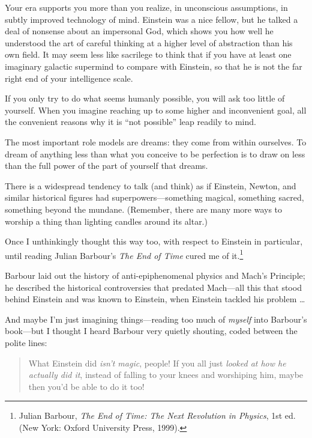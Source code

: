 {
 Your era supports you more than you realize, in unconscious
assumptions, in subtly improved technology of mind. Einstein was a nice
fellow, but he talked a deal of nonsense about an impersonal God, which
shows you how well he understood the art of careful thinking at a
higher level of abstraction than his own field. It may seem less like
sacrilege to think that if you have at least one imaginary galactic
supermind to compare with Einstein, so that he is not the far right end
of your intelligence scale.}

{
 If you only try to do what seems humanly possible, you will ask
too little of yourself. When you imagine reaching up to some higher and
inconvenient goal, all the convenient reasons why it is
``not possible'' leap readily to
mind.}

{
 The most important role models are dreams: they come from within
ourselves. To dream of anything less than what you conceive to be
perfection is to draw on less than the full power of the part of
yourself that dreams.}

\myendsectiontext


{
 There is a widespread tendency to talk (and think) as if Einstein,
Newton, and similar historical figures had superpowers---something
magical, something sacred, something beyond the mundane. (Remember,
there are many more ways to worship a thing than lighting candles
around its altar.) }

{
 Once I unthinkingly thought this way too, with respect to Einstein
in particular, until reading Julian Barbour's
\textit{The End of Time} cured me of it.\footnote{Julian Barbour, \textit{The End of Time: The Next Revolution in
Physics}, 1st ed. (New York: Oxford University Press, 1999).}}

{
 Barbour laid out the history of anti-epiphenomenal physics and
Mach's Principle; he described the historical
controversies that predated Mach---all this that stood behind Einstein
and was known to Einstein, when Einstein tackled his problem \ldots}

{
 And maybe I'm just imagining things---reading too
much of \textit{myself} into Barbour's book---but I
thought I heard Barbour very quietly shouting, coded between the polite
lines:}

\begin{quote}
{
 What Einstein did \textit{isn't magic}, people! If
you all just \textit{looked at how he actually did it}, instead of
falling to your knees and worshiping him, maybe then
you'd be able to do it too!}
\end{quote}


